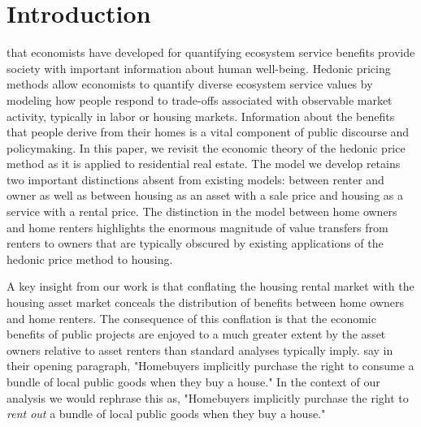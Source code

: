 \documentclass[ecta,nameyear,draft]{econsocart}
\theoremstyle{plain}
\theoremstyle{remark}
\begin{document}
\section{Introduction}
 that economists have developed for quantifying ecosystem service benefits provide society with important information about human well-being. Hedonic pricing methods allow economists to quantify diverse ecosystem service values by modeling how people respond to trade-offs associated with observable market activity, typically in labor or housing markets. Information about the benefits that people derive from their homes is a vital component of public discourse and policymaking. In this paper, we revisit the economic theory of the hedonic price method as it is applied to residential real estate. The model we develop retains two important distinctions absent from existing models: between renter and owner as well as between housing as an asset with a sale price and housing as a service with a rental price. The distinction in the model between home owners and home renters highlights the enormous magnitude of value transfers from renters to owners that are typically obscured by existing applications of the hedonic price method to housing.


A key insight from our work is that conflating the housing rental market with the housing asset market conceals the distribution of benefits between home owners and home renters. The consequence of this conflation is that the economic benefits of public projects are enjoyed to a much greater extent by the asset owners relative to asset renters than standard analyses typically imply. \cite{kuminoffpope14} say in their opening paragraph, "Homebuyers implicitly purchase the right to consume a bundle of local public goods when they buy a house." In the context of our analysis we would rephrase this as, "Homebuyers implicitly purchase the right to \textit{rent out} a bundle of local public goods when they buy a house."
\end{document}
